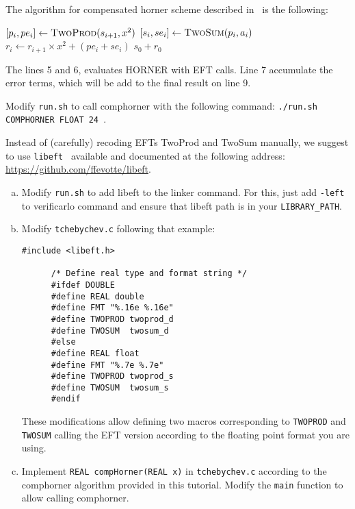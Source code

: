 The algorithm for compensated horner scheme described in~\cite{graillat2005compensated} is the following:

\begin{algorithmic}[1]
       \State $[p_i, pe_i] \gets \text{\sc TwoProd}(s_{i+1}, x^2)$
       \State $[s_i, se_i] \gets \text{\sc TwoSum}(p_i, a_i)$
       \State $r_i \gets r_{i+1}\times x^2+(pe_i+se_i)$
    \EndFor
    \State \Return $s_0 + r_0$
  \EndProcedure
\end{algorithmic}

The lines 5 and 6, evaluates HORNER with EFT calls. Line 7 accumulate the error terms, which will be add to the final result on line 9.

\begin{question}
    \item Modify {\tt run.sh} to call comphorner with the following command: {\tt ./run.sh COMPHORNER FLOAT 24 }.
\end{question}

Instead of (carefully) recoding EFTs {\sc TwoProd} and {\sc TwoSum} manually, we suggest to use {\tt libeft}~\cite{libeft} available and documented at the following address: \url{https://github.com/ffevotte/libeft}.

\begin{question}
  \begin{enumerate}[(a)]
    \item Modify {\tt run.sh} to add libeft to the linker command. For this, just add {\tt -left} to verificarlo command and ensure that libeft path is in your  {\tt LIBRARY\_PATH}.
    \item Modify {\tt tchebychev.c} following that example:

      {
      \begin{lstlisting}[style=customC, basicstyle=\normalsize]
      #include <libeft.h>

      /* Define real type and format string */
      #ifdef DOUBLE
      #define REAL double
      #define FMT "%.16e %.16e"
      #define TWOPROD twoprod_d
      #define TWOSUM  twosum_d
      #else
      #define REAL float
      #define FMT "%.7e %.7e"
      #define TWOPROD twoprod_s
      #define TWOSUM  twosum_s
      #endif
      \end{lstlisting}
      }

     These modifications allow defining two macros corresponding to  {\tt TWOPROD} and {\tt TWOSUM} calling the EFT version according to the floating point format you are using.


    \item Implement {\tt REAL compHorner(REAL x)} in {\tt tchebychev.c} according to the comphorner algorithm provided in this tutorial. Modify the {\tt main} function to allow calling comphorner.
    \end{enumerate}
\end{question}


